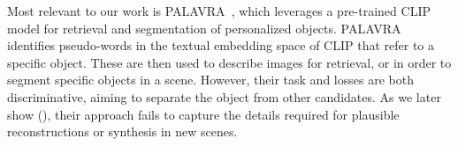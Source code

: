 Most relevant to our work is PALAVRA~\citep{cohen2022my}, which leverages a pre-trained CLIP model for retrieval and segmentation of personalized objects. PALAVRA identifies pseudo-words in the textual embedding space of CLIP that refer to a specific object. These are then used to describe images for retrieval, or in order to segment specific objects in a scene. However, their task and losses are both discriminative, aiming to separate the object from other candidates. As we later show (), their approach fails to capture the details required for plausible reconstructions or synthesis in new scenes.
